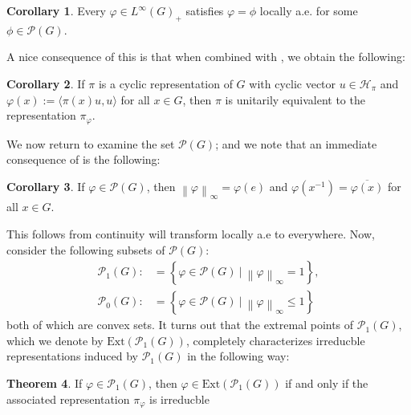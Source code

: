 \documentclass[10pt,twoside,openany,final]{memoir}
\theoremstyle{definition}
\newtheorem{theorem}{Theorem}[chapter]
\newtheorem{corollary}[theorem]{Corollary}
\theoremstyle{Break}
\newcommand{\lv}{\left\lVert}
\newcommand{\rv}{\right\rVert}
\renewcommand{\H}{\mathcal{H}}
\begin{document}
\begin{corollary}
	Every $\varphi \in L^\infty(G)_+$ satisfies $\varphi=\phi$ locally a.e. for some $\phi \in \mathcal{P}(G)$.
\end{corollary}
A nice consequence of this is that when combined with , we obtain the following:
\begin{corollary}
If $\pi$ is a cyclic representation of $G$ with cyclic vector $u \in \H_\pi$ and $\varphi(x):=\langle \pi(x) u,u\rangle$ for all $x \in G$, then $\pi$ is unitarily equivalent to the representation $\pi_\varphi$.	
\end{corollary}

We now return to examine the set $\mathcal{P}(G)$; and we note that an immediate consequence of  is the following:
\begin{corollary}
	If $\varphi \in \mathcal{P}(G)$, then $\lv \varphi \rv_\infty = \varphi(e)$ and $\varphi(x^{-1})=\overline{\varphi(x)}$ for all $x \in G$.
	\label{3.22}
\end{corollary}
This follows from continuity will transform locally a.e to everywhere. Now, consider the following subsets of $\mathcal{P}(G)$:
\begin{align*}
	\mathcal{P}_1(G):&=\left\{ \varphi \in \mathcal{P}(G) \ \big| \ \lv \varphi \rv_\infty =1 \right\},\\
	\mathcal{P}_0(G):&=\left\{ \varphi \in \mathcal{P}(G) \ \big| \ \lv\varphi \rv_\infty \leq 1 \right\}
\end{align*}
both of which are convex sets. It turns out that the extremal points of $\mathcal{P}_1(G)$, which we denote by $\mathrm{Ext}(\mathcal{P}_1(G))$, completely characterizes irreducble representations induced by $\mathcal{P}_1(G)$ in the following way:
\begin{theorem}
	If $\varphi \in \mathcal{P}_1(G)$, then $\varphi \in \mathrm{Ext}(\mathcal{P}_1(G))$ if and only if the associated representation $\pi_\varphi$ is irreducble
	\label{3.25}
\end{theorem}
\end{document}
